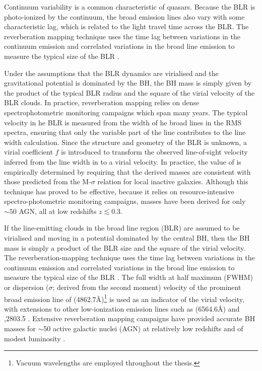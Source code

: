 Continuum variability is a common characteristic of quasars. 
Because the BLR is photo-ionized by the continuum, the broad emission lines also vary with some characteristic lag, which is related to the light travel time across the BLR. 
The reverberation mapping technique uses the time lag between variations in the continuum emission and correlated variations in the broad line emission to measure the typical size of the BLR \citep[see review by][]{netzer97}. 

Under the assumptions that the BLR dynamics are virialised and the gravitational potential is dominated by the BH, the BH mass is simply given by the product of the typical BLR radius and the square of the virial velocity of the BLR clouds. 
In practice, reverberation mapping relies on dense spectrophotometric monitoring campaigns which span many years. 
The typical velocity in he BLR is measured from the width of he broad \hb lines in the RMS spectra, ensuring that only the variable part of the line contributes to the line width calculation. 
Since the structure and geometry of the BLR is unknown, a virial coefficient $f$ is introduced to transform the observed line-of-sight velocity inferred from the line width in to a virial velocity. 
In practice, the value of is empirically determined by requiring that the derived masses are consistent with those predicted from the M-$\sigma$ relation for local inactive galaxies. 
Although this technique has proved to be effective, because it relies on resource-intensive spectro-photometric monitoring campaigns, masses have been derived for only $\sim50$ AGN, all at low redshifts $z\lesssim0.3$. 

If the line-emitting clouds in the broad line region (BLR) are assumed to be virialised and moving in a potential dominated by the central BH, then the BH mass is simply a product of the BLR size and the square of the virial velocity.
The reverberation-mapping technique uses the time lag between variations in the continuum emission and correlated variations in the broad line emission to measure the typical size of the BLR \citep{peterson93,peterson14}. 
The full width at half maximum (FWHM) or dispersion ($\sigma$; derived from the second moment) velocity of the prominent broad emission line of \hb (4862.7\AA)\footnote{Vacuum wavelengths are employed throughout the thesis.} is used as an indicator of the virial velocity, with extensions to other low-ionization emission lines such as \ha (6564.6\AA) and ,2803.5 \citep[e.g.][]{vestergaard02,mclure02,wu04,kollmeier06,onken08,wang09,rafiee11}.
Extensive reverberation mapping campaigns have provided accurate BH masses for $\sim$50 active galactic nuclei (AGN) at relatively low redshifts and of modest luminosity \citep[e.g.][]{kaspi00,kaspi07,peterson04,bentz09,denney10}. 

